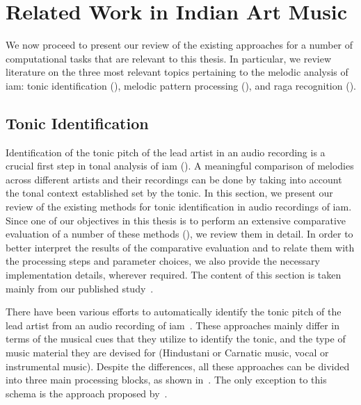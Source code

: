 \section{Related Work in Indian Art Music}
\label{sec:background_relevant_work_iam}

We now proceed to present our review of the existing approaches for a number of  computational tasks that are relevant to this thesis. In particular, we review literature on the three most relevant topics pertaining to the melodic analysis of \gls{iam}: tonic identification (), melodic pattern processing (), and  \gls{raga} recognition ().  


\subsection{Tonic Identification}
\label{sec:background_relevant_work_tonic_identification}

Identification of the tonic pitch of the lead artist in an audio recording is a crucial first step in tonal analysis of \gls{iam} (). A meaningful comparison of melodies across different artists and their recordings can be done by taking into account the tonal context established set by the tonic. In this section, we present our review of the existing methods for tonic identification in audio recordings of \gls{iam}. Since one of our objectives in this thesis is to perform an extensive comparative evaluation of a number of these methods (), we review them in detail. In order to better interpret the results of the comparative evaluation and to relate them with the processing steps and parameter choices, we also provide the necessary implementation details, wherever required. The content of this section is taken mainly from our published study~\citep{Gulati2014Tonic}.

There have been various efforts to automatically identify the tonic pitch of the lead artist from an audio recording of \gls{iam}~\citep{salamon2012multipitch,gulati2012two,bellur2012knowledge,ranjani2011carnatic,Sengupta2005b,chordia2013joint}. These approaches mainly differ in terms of the musical cues that they utilize to identify the tonic, and the type of music material they are devised for (Hindustani or Carnatic music, vocal or
instrumental music). Despite the differences, all these approaches can be divided into three main processing blocks, as shown in~. The only exception to this schema is the approach proposed by~\cite{Sengupta2005b}. 

